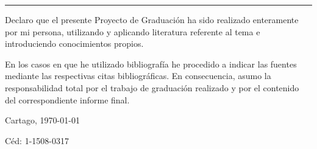 \thispagestyle{empty}

\rule{10mm}{0pt}

\vfill

Declaro que el presente Proyecto de Graduación ha sido realizado enteramente
por mi persona, utilizando y aplicando literatura referente al tema e
introduciendo conocimientos propios.

En los casos en que he utilizado bibliografía he procedido a indicar las
fuentes mediante las respectivas citas bibliográficas.  En consecuencia,
asumo la responsabilidad total por el trabajo de graduación realizado y por
el contenido del correspondiente informe final.



\vspace*{8mm}

\begin{flushright}
  \scriptAuthor\par
  Cartago, \today\par
  Céd: 1-1508-0317
\end{flushright}

\cleardoublepage


